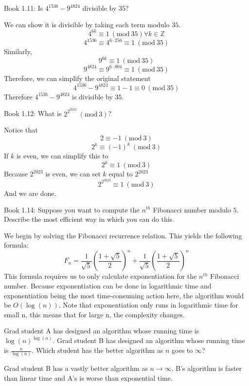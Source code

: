 \documentclass[boxes]{rutgers_hw}
\newcommand{\Mod}[1]{\ (\mathrm{mod}\ #1)}
\begin{document}
\begin{exern}{3}
  Book 1.11: Is $4^{1536} - 9^{4824}$ divisible by $35$?
\end{exern}
\begin{solution} 
  We can show it is divisible by taking each term modulo $35$.
  \[4^{6k} \equiv 1 \Mod{35} \forall k \in \mathbb{Z}\]
  \[4^{1536} \equiv 4^{6\cdot256} \equiv 1 \Mod{35}\]
  Similarly,
  \[9^{6k} \equiv 1 \Mod{35}\]
  \[9^{4824} \equiv 9^{6\cdot804} \equiv 1 \Mod{35} \]
  Therefore, we can simplify the original statement
  \[4^{1536} - 9^{4824} \equiv 1 - 1 \equiv 0 \Mod{35}\]
  Therefore $4^{1536} - 9^{4824}$ is divisible by 35.
\end{solution}

\begin{exern}{4}
    Book 1.12: What is $2^{2^{2023}}\Mod 3$?
\end{exern}
\begin{solution}
    Notice that \[2 \equiv -1 \Mod 3\]
    \[2^k \equiv {(-1)}^k \Mod 3\]
    If $k$ is even, we can simplify this to
    \[2^k \equiv 1 \Mod 3\]
    Because $2^{2023}$ is even, we can set $k$ equal to $2^{2023}$
    \[2^{2^{2023}} \equiv 1 \Mod 3\]
    And we are done.
\end{solution}

\pagebreak

\begin{exern}{5}
    Book 1.14: Suppose you want to compute the $n^{th}$ Fibonacci number modulo $5$. Describe the most efficient way in which you can do this.
\end{exern}
\begin{solution}
    We begin by solving the Fibonacci recurrence relation. This yields the following formula:
    \[F_n = \frac1{\sqrt5} {\left(\frac{1 + \sqrt 5}2\right)}^n + \frac1{\sqrt5}{\left(\frac{1 + \sqrt5}2\right)}^n\]
    This formula requires us to only calculate exponentiation for the $n^{th}$ Fibonacci number. Because exponentiation can be done in logarithmic time and exponentiation being the most time-consuming action here, the algorithm would be $O(\log(n))$. Note that exponentiation only runs in logarithmic time for  small n, this means that for large n, the complexity changes.
\end{solution}

\begin{exern}{6}
    Grad student A has designed an algorithm whose running time is ${\log(n)}^{\log(n)}$. Grad student B has designed an algorithm whose running time is $\frac n{\log(n)}$. Which student has the better algorithm as $n$ goes to $\infty$?
\end{exern}
\begin{solution}
    Grad student B has a vastly better algorithm as $n \to \infty$. B's algorithm is faster than linear time and A's is worse than exponential time.
\end{solution}
\end{document}
